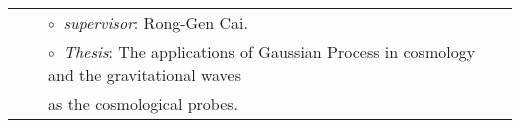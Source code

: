 \documentclass[letterpaper]{moderncv}
\begin{document}
\vspace{0.2cm}
\vspace{-0.1cm}
\begin{tabular}{rcl}
&\hspace{0.4cm} &$\circ\;\;${\textit{supervisor}}: Rong-Gen Cai.\\
&\hspace{0.4cm} &$\circ\;\;${\textit{Thesis}}: The applications of Gaussian Process in cosmology and the gravitational waves \\&\hspace{0.4cm} & 
\hspace{0.4cm}as the cosmological probes.
\end{tabular}

\end{document}
